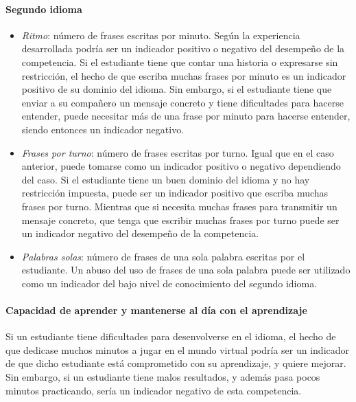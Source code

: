 \paragraph*{Segundo idioma}
\begin{itemize}
\item \emph{Ritmo}: número de frases escritas por minuto. Según la experiencia desarrollada podría ser un indicador positivo o negativo del desempeño de la competencia. Si el estudiante tiene que contar una historia o expresarse sin restricción, el hecho de que escriba muchas frases por minuto es un indicador positivo de su dominio del idioma. Sin embargo, si el estudiante tiene que enviar a su compañero un mensaje concreto y tiene dificultades  para hacerse entender, puede necesitar más de una frase por minuto para hacerse entender, siendo entonces un indicador negativo.
\item \emph{Frases por turno}: número de frases escritas por turno. Igual que en el caso anterior, puede tomarse como un indicador positivo o negativo dependiendo del caso. Si el estudiante tiene un buen dominio del idioma y no hay restricción impuesta, puede ser un indicador positivo que escriba muchas frases por turno. Mientras que si necesita muchas frases para transmitir un mensaje concreto, que tenga que escribir muchas frases por turno puede ser un indicador negativo del desempeño de la competencia.
\item \emph{Palabras solas}: número de frases de una sola palabra escritas por el estudiante. Un abuso del uso de frases de una sola palabra puede ser utilizado como un indicador del bajo nivel de conocimiento del segundo idioma.
\end{itemize}

\paragraph*{Capacidad de aprender y mantenerse al día con el aprendizaje}
Si un estudiante tiene dificultades para desenvolverse en el idioma, el hecho de que dedicase muchos minutos a jugar en el mundo virtual podría ser un indicador de que dicho estudiante está comprometido con su aprendizaje, y quiere mejorar. Sin embargo, si un estudiante tiene malos resultados, y además pasa pocos minutos practicando, sería un indicador negativo de esta competencia.




